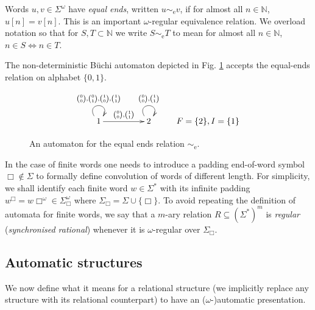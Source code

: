 \documentclass{stacs_proc}
\newcommand{\Nat}{\mathbb{N}}
\newcommand{\eqe}{\sim_{\textrm{e}}}
\begin{document}
Words $u,v \in \Sigma^{\omega}$ have {\em equal ends}, written $u \eqe v$, if
for almost all $n \in \Nat$, $u[n] = v[n]$.  This is an important
$\omega$-regular equivalence relation. We overload notation so that for $S,T
\subset \Nat$ we write $S \eqe T$ to mean for almost all $n \in \Nat$, $n \in S
\iff n \in T$.
 
\begin{example}\label{ex_1} The non-deterministic B\"uchi automaton depicted in
Fig. \ref{fig_ex1} accepts the equal-ends relation on alphabet $\{0,1\}$. 

\begin{figure}[h]
\begin{displaymath}
\xymatrix{
   1 \ar@(ul,ur)^{\binom{0}{0},\binom{0}{1},\binom{1}{0},\binom{1}{1}} 
     \ar [rr]^{\binom{0}{0},\binom{1}{1}} & *{} & 
   2 \ar@(ul,ur)^{\binom{0}{0},\binom{1}{1}} &  F = \{2\}, I = \{1\} \\
}
\end{displaymath}
\caption{An automaton for the equal ends relation $\eqe$.}
\label{fig_ex1}
\end{figure}
\end{example}

In the case of finite words one needs to introduce a padding
end-of-word symbol $\Box \not\in \Sigma$ 
to formally define convolution of words of different length. 
For simplicity, we shall identify each finite word $w \in \Sigma^\ast$
with its infinite padding $w^{\Box} = w \Box^\omega \in \Sigma_\Box^\omega$ 
where $\Sigma_\Box = \Sigma \cup \{\Box\}$. 
To avoid repeating the definition of automata for finite words,
we say that a $m$-ary relation $R \subseteq (\Sigma^\ast)^m$ 
is \emph{regular} (\emph{synchronised rational}) whenever 
it is $\omega$-regular over $\Sigma_\Box$.


\vskip-0.3cm
\subsection{Automatic structures}

We now define what it means for a relational structure (we implicitly replace
any structure with its relational counterpart) to have an ($\omega$-)automatic
presentation. 
\end{document}
